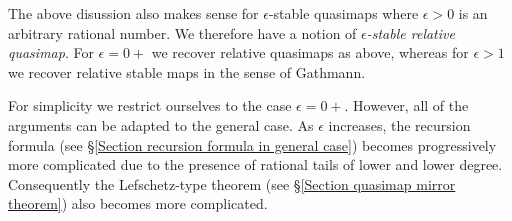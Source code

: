 \begin{remark} The above disussion also makes sense for $\epsilon$-stable quasimaps where $\epsilon > 0$ is an arbitrary rational number. We therefore have a notion of \emph{$\epsilon$-stable relative quasimap}. For $\epsilon=0+$ we recover relative quasimaps as above, whereas for $\epsilon>1$ we recover relative stable maps in the sense of Gathmann.

For simplicity we restrict ourselves to the case $\epsilon=0+$. However, all of the arguments can be adapted to the general case. As $\epsilon$ increases, the recursion formula (see \S \ref{Section recursion formula in general case}) becomes progressively more complicated due to the presence of rational tails of lower and lower degree. Consequently the Lefschetz-type theorem (see \S \ref{Section quasimap mirror theorem}) also becomes more complicated.
\end{remark}



